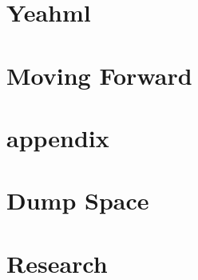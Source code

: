 \documentclass[12pt]{book}
\begin{document}


\part{Yeahml}




\part{Moving Forward}



\part{appendix}




\part{Dump Space}




\part{Research}





\backmatter 


\printindex



%
%
%

{\footnotesize
	}
%
\end{document}
